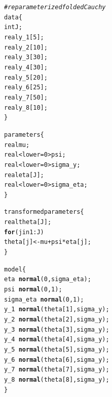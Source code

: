 \documentclass[12pt]{article}\usepackage[]{graphicx}\usepackage[]{color}
\makeatletter
\newcommand{\hlcom}[1]{\textcolor[rgb]{0.678,0.584,0.686}{\textit{#1}}}%
\newcommand{\hlkwd}[1]{\textcolor[rgb]{0.737,0.353,0.396}{\textbf{#1}}}%
\newenvironment{kframe}{%
 \def\at@end@of@kframe{}%
 \ifinner\ifhmode%
  \def\at@end@of@kframe{\end{minipage}}%
  \begin{minipage}{\columnwidth}%
 \fi\fi%
 \def\FrameCommand##1{\hskip\@totalleftmargin \hskip-\fboxsep
 \colorbox{shadecolor}{##1}\hskip-\fboxsep
     \hskip-\linewidth \hskip-\@totalleftmargin \hskip\columnwidth}%
 \MakeFramed {\advance\hsize-\width
   \@totalleftmargin\z@ \linewidth\hsize
   \@setminipage}}%
 {\par\unskip\endMakeFramed%
 \at@end@of@kframe}
\newenvironment{knitrout}{}{} %
\makeatother
\begin{document}
\begin{knitrout}\footnotesize
{}\color{fgcolor}\begin{kframe}
\begin{alltt}
\hlcom{#reparameterized folded Cauchy}
data \{
  int J; 
  real y_1[5]; 
  real y_2[10];
  real y_3[30];
  real y_4[30];
  real y_5[20];
  real y_6[25];
  real y_7[50];
  real y_8[10];
\}

parameters \{
  real mu; 
  real<lower=0> psi;
  real<lower=0> sigma_y;
  real eta[J];
  real<lower=0> sigma_eta;
\}

transformed parameters \{
  real theta[J];
  \hlkwd{for} (j in 1:J)
    theta[j] <- mu + psi * eta[j];
\}

model \{
  eta ~ \hlkwd{normal}(0, sigma_eta);
  psi ~ \hlkwd{normal}(0, 1);
  sigma_eta ~ \hlkwd{normal}(0, 1);
  y_1 ~ \hlkwd{normal}(theta[1], sigma_y);
  y_2 ~ \hlkwd{normal}(theta[2], sigma_y);
  y_3 ~ \hlkwd{normal}(theta[3], sigma_y);
  y_4 ~ \hlkwd{normal}(theta[4], sigma_y);
  y_5 ~ \hlkwd{normal}(theta[5], sigma_y);
  y_6 ~ \hlkwd{normal}(theta[6], sigma_y);
  y_7 ~ \hlkwd{normal}(theta[7], sigma_y);
  y_8 ~ \hlkwd{normal}(theta[8], sigma_y); 
\}
\end{alltt}
\end{kframe}
\end{knitrout}
\end{document}
